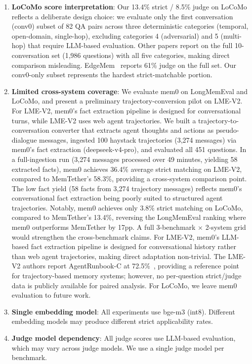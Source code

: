 \documentclass[10pt]{article}
\begin{document}
\begin{enumerate}
\item \textbf{LoCoMo score interpretation}: Our 13.4\% strict / 8.5\% judge on LoCoMo reflects a deliberate design choice: we evaluate only the first conversation (conv0) subset of 82 QA pairs across three deterministic categories (temporal, open-domain, single-hop), excluding categories 4 (adversarial) and 5 (multi-hop) that require LLM-based evaluation. Other papers report on the full 10-conversation set (1{,}986 questions) with all five categories, making direct comparison misleading. EdgeMem~\citep{edgemem2025} reports 61\% judge on the full set. Our conv0-only subset represents the hardest strict-matchable portion.\item \textbf{Limited cross-system coverage}: We evaluate mem0 on LongMemEval and LoCoMo, and present a preliminary trajectory-conversion pilot on LME-V2. For LME-V2, mem0's fact extraction pipeline is designed for conversational turns, while LME-V2 uses web agent trajectories. We built a trajectory-to-conversation converter that extracts agent thoughts and actions as pseudo-dialogue messages, ingested 100 haystack trajectories (3,274 messages) via mem0's fact extraction (deepseek-v4-pro), and evaluated all 451 questions. In a full-ingestion run (3,274 messages processed over 49 minutes, yielding 58 extracted facts), mem0 achieves 36.4\% average strict matching on LME-V2, compared to MemTether's 58.3\%, providing a cross-system comparison point. The low fact yield (58 facts from 3,274 trajectory messages) reflects mem0's conversational fact extraction being poorly suited to structured agent trajectories. Notably, mem0 achieves only 3.8\% strict matching on LoCoMo, compared to MemTether's 13.4\%, reversing the LongMemEval ranking where mem0 outperforms MemTether by 17pp. A full 3-benchmark $\times$ 2-system grid would strengthen the cross-benchmark claims. For LME-V2, mem0's LLM-based fact extraction pipeline is designed for conversational history rather than web agent trajectories, making direct adaptation non-trivial. The LME-V2 authors report AgentRunbook-C at 72.5\%~\citep{longmemevalv2}, providing a reference point for trajectory-based memory systems; however, no per-question strict/judge data is publicly available for paired analysis. For LoCoMo, we leave mem0 evaluation to future work.
\item \textbf{Single embedding model}: All experiments use bge-m3 (int8). Different embedding models may produce different strict applicability rates.
\item \textbf{Judge model dependency}: All judge scores use LLM-based evaluation, which may vary across judge models. We use a single judge model per benchmark.

\end{enumerate}
\end{document}
